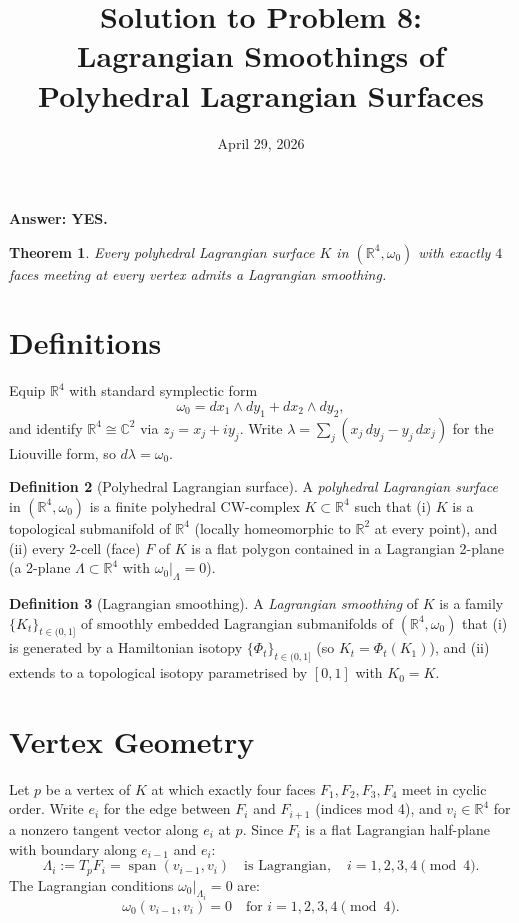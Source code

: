 \documentclass[12pt]{article}
\title{Solution to Problem 8:\\
Lagrangian Smoothings of Polyhedral Lagrangian Surfaces}
\author{}
\date{April 29, 2026}
\newtheorem{theorem}{Theorem}
\theoremstyle{definition}
\newtheorem{definition}[theorem]{Definition}
\newcommand{\R}{\mathbb{R}}
\newcommand{\C}{\mathbb{C}}
\newcommand{\La}{\Lambda}
\newcommand{\om}{\omega}
\begin{document}
\maketitle

\textbf{Answer: YES.}

\begin{theorem}\label{thm:main}
Every polyhedral Lagrangian surface $K$ in $(\R^4,\om_0)$ with exactly
$4$ faces meeting at every vertex admits a Lagrangian smoothing.
\end{theorem}

\section{Definitions}\label{sec:def}

Equip $\R^4$ with standard symplectic form
\begin{equation}\label{eq:symp}
  \om_0 = dx_1\wedge dy_1 + dx_2\wedge dy_2,
\end{equation}
and identify $\R^4\cong\C^2$ via $z_j=x_j+iy_j$.  Write
$\lambda=\sum_j(x_j\,dy_j-y_j\,dx_j)$ for the Liouville form,
so $d\lambda=\om_0$.

\begin{definition}[Polyhedral Lagrangian surface]\label{def:poly}
A \emph{polyhedral Lagrangian surface} in $(\R^4,\om_0)$ is a finite
polyhedral CW-complex $K\subset\R^4$ such that (i) $K$ is a topological
submanifold of $\R^4$ (locally homeomorphic to $\R^2$ at every point),
and (ii) every 2-cell (face) $F$ of $K$ is a flat polygon contained in a
Lagrangian 2-plane (a 2-plane $\La\subset\R^4$ with $\om_0|_\La=0$).
\end{definition}

\begin{definition}[Lagrangian smoothing]\label{def:smoothing}
A \emph{Lagrangian smoothing} of $K$ is a family
$\{K_t\}_{t\in(0,1]}$ of smoothly embedded Lagrangian submanifolds of
$(\R^4,\om_0)$ that (i) is generated by a Hamiltonian isotopy
$\{\Phi_t\}_{t\in(0,1]}$ (so $K_t=\Phi_t(K_1)$), and (ii) extends to a
topological isotopy parametrised by $[0,1]$ with $K_0=K$.
\end{definition}

\section{Vertex Geometry}\label{sec:vertex}

Let $p$ be a vertex of $K$ at which exactly four faces
$F_1,F_2,F_3,F_4$ meet in cyclic order.  Write $e_i$ for the edge
between $F_i$ and $F_{i+1}$ (indices mod 4), and $v_i\in\R^4$ for a
nonzero tangent vector along $e_i$ at $p$.  Since $F_i$ is a flat Lagrangian
half-plane with boundary along $e_{i-1}$ and $e_i$:
\begin{equation}\label{eq:faces}
  \La_i:=T_pF_i=\operatorname{span}(v_{i-1},v_i)\quad\text{is Lagrangian},
  \quad i=1,2,3,4\pmod{4}.
\end{equation}
The Lagrangian conditions $\om_0|_{\La_i}=0$ are:
\begin{equation}\label{eq:Lagcond}
  \om_0(v_{i-1},v_i)=0\quad\text{for }i=1,2,3,4\pmod{4}.
\end{equation}
\end{document}
